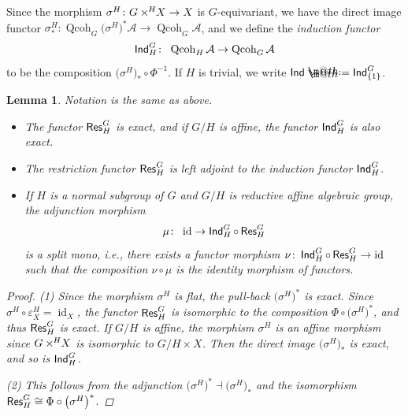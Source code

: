 \documentclass[10pt,a4paper]{amsart}
\makeatletter
\newtheorem{lem}[dfn]{Lemma}
\newcommand*{\defeq}{\mathrel{\rlap{%
 \raisebox{0.3ex}{$\m@th\cdot$}}%
 \raisebox{-0.3ex}{$\m@th\cdot$}}%
 =}
\numberwithin{equation}{section}
\newcommand{\Qcoh}{\operatorname{Qcoh}}
\newcommand{\id}{\operatorname{id}}
\newcommand{\Res}{\operatorname{\sf Res}}
\newcommand{\Ind}{\operatorname{\sf Ind}}
\newcommand{\cA}{\mathcal{A}}
\newcommand{\timesH}{\times^{\hspace{-0.2mm}H\hspace{0.2mm}}\!\!}
\makeatother
\begin{document}
Since the morphism $\sigma^H\colon G\timesH X\to X$ is $G$-equivariant, we have the direct image functor $\sigma^H_*\colon\Qcoh_G\big(\sigma^{H}\big)^*\cA\to\Qcoh_G\cA$, and
we define the {\it induction functor}
\begin{gather*}
\Ind^G_H\colon\ \Qcoh_H \cA\to \Qcoh_G\cA
\end{gather*}
to be the composition $\big(\sigma^H\big)_*\circ \Phi^{-1}$. If $H$ is trivial, we write $\Ind\defeq\Ind^G_{\{1\}}$.
\begin{lem}\label{split mono} Notation is the same as above.
\begin{itemize}\itemsep=0pt
\item[$1.$] The functor $\Res^G_H$ is exact, and if $G/H$ is affine, the functor $\Ind^G_H$ is also exact.
\item[$2.$] The restriction functor $\Res^G_H$ is left adjoint to the induction functor $\Ind^G_H$.
\item[$3.$] If $H$ is a normal subgroup of $G$ and $G/H$ is reductive affine algebraic group, the adjunction morphism
\begin{gather*}
\mu\colon\ \id\to \Ind^G_H\circ \Res^G_H
\end{gather*}
is a split mono, i.e., there exists a functor morphism $\nu\colon\Ind^G_H\circ\Res^G_H\to \id$ such that the composition $\nu\circ\mu$ is the identity morphism of functors.

\end{itemize}
\begin{proof}
(1) Since the morphism $\sigma^H$ is flat, the pull-back $\big(\sigma^H\big)^*$ is exact. Since $\sigma^{H}\circ\varepsilon_X^H=\id_X$, the functor $\Res^G_H$ is isomorphic to the composition $\Phi\circ\big(\sigma^{H}\big)^*$, and thus $\Res^G_H$ is exact. If $G/H$ is affine, the morphism $\sigma^H$ is an affine morphism since $G\timesH X$ is isomorphic to $G/H\times X$. Then the direct image $\big(\sigma^{H}\big)_*$ is exact, and so is $\Ind^G_H$.

(2) This follows from the adjunction $\big(\sigma^{H}\big)^*\dashv\big(\sigma^{H}\big)_*$ and the isomorphism $\Res^G_H\cong \Phi\circ\big(\sigma^{H}\big)^*$.


\end{proof}
\end{lem}
\end{document}
